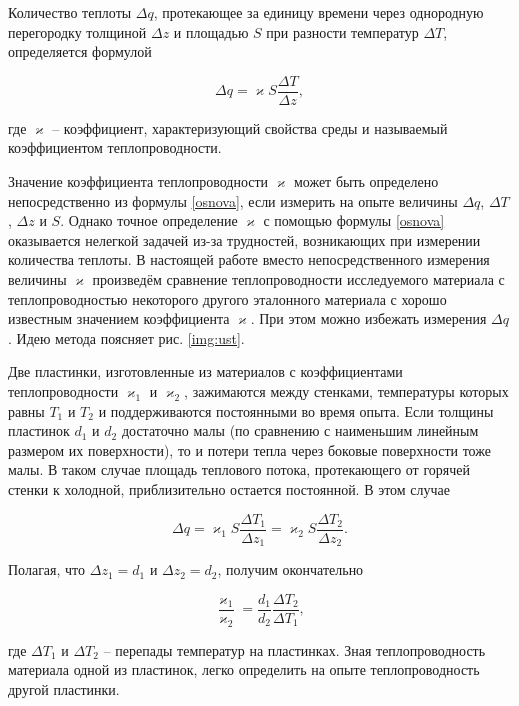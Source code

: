 \documentclass[a4paper,12pt]{article} %
\begin{document}
Количество теплоты $ \Delta q $, протекающее за единицу времени через однородную перегородку толщиной $ \Delta z $ и площадью $ S $ при разности температур $ \Delta T $, определяется формулой

\begin{equation}\label{osnova}
\Delta q = \varkappa S \frac{\Delta T}{\Delta z},
\end{equation}

где $ \varkappa $ -- коэффициент, характеризующий свойства среды и называемый коэффициентом теплопроводности.

Значение коэффициента теплопроводности $ \varkappa $ может быть определено непосредственно из формулы \eqref{osnova}, если измерить на опыте величины $ \Delta q $, $ \Delta T $, $ \Delta z $ и $ S $. Однако точное определение $ \varkappa $ с помощью формулы \eqref{osnova} оказывается нелегкой задачей из-за трудностей, возникающих при измерении количества теплоты. В настоящей работе вместо непосредственного измерения величины $ \varkappa $ произведём сравнение теплопроводности исследуемого материала с теплопроводностью некоторого другого эталонного материала с хорошо известным значением коэффициента $ \varkappa $. При этом можно избежать измерения $ \Delta q $. Идею метода поясняет рис. \ref{img:ust}.

Две пластинки, изготовленные из материалов с коэффициентами теплопроводности $ \varkappa_1 $ и $ \varkappa_2 $, зажимаются между стенками, температуры которых равны $ T_1 $ и $ T_2 $ и поддерживаются постоянными во время опыта. Если толщины пластинок $ d_1 $ и $ d_2 $ достаточно малы (по сравнению с наименьшим линейным размером их поверхности), то и потери тепла через боковые поверхности тоже малы. В таком случае площадь теплового потока, протекающего от горячей стенки к холодной, приблизительно остается постоянной. В этом случае

\begin{equation}\label{vivod}
\Delta q = \varkappa_1 S \frac{\Delta T_1}{\Delta z_1} = \varkappa_2 S \frac{\Delta T_2}{\Delta z_2}.
\end{equation}

Полагая, что $ \Delta z_1=d_1 $ и $ \Delta z_2=d_2 $, получим окончательно

\begin{equation}\label{itog}
\frac{\varkappa_1}{\varkappa_2} = \frac{d_1}{d_2}\frac{\Delta T_2}{\Delta T_1},
\end{equation}

где $ \Delta T_1 $ и $ \Delta T_2 $ -- перепады температур на пластинках. Зная теплопроводность материала одной из пластинок, легко определить на опыте теплопроводность другой пластинки.
\end{document}
